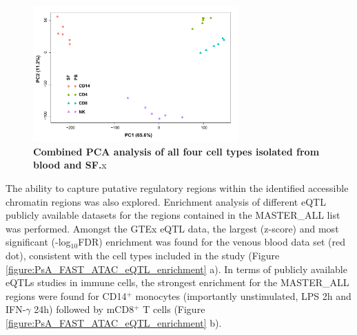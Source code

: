 \begin{figure}[H]
\centering
\includegraphics[width=0.7\textwidth]{./Results3/pdfs/ATAC_PSA_all_DESEq2_PCA}
\caption[Combined PCA analysis of all four cell types isolated from blood and SF.]{\textbf{Combined PCA analysis of all four cell types isolated from blood and SF.}x}
\label{figure:PsA_FAST_ATAC_PCA}
\end{figure}

The ability to capture putative regulatory regions within the identified accessible chromatin regions was also explored. Enrichment analysis of different eQTL publicly available datasets for the regions contained in the MASTER\_ALL list was performed. Amongst the GTEx eQTL data, the largest (z-score) and most significant (-log$_10$FDR) enrichment was found for the venous blood data set (red dot), consistent with the cell types included in the study (Figure \ref{figure:PsA_FAST_ATAC_eQTL_enrichment} a). In terms of publicly available eQTLs studies in immune cells, the strongest enrichment for the MASTER\_ALL regions were found for CD14$^+$ monocytes (importantly unstimulated, LPS 2h and IFN-$\gamma$ 24h) followed by mCD8$^+$ T cells (Figure \ref{figure:PsA_FAST_ATAC_eQTL_enrichment} b).

